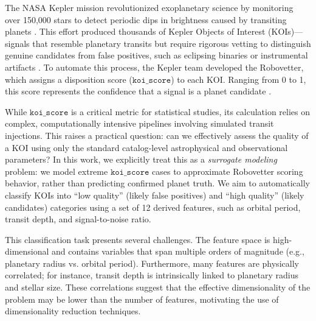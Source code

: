 The NASA Kepler mission revolutionized exoplanetary science by monitoring over 150,000 stars to detect periodic dips in brightness caused by transiting planets \cite{borucki2010kepler}. This effort produced thousands of Kepler Objects of Interest (KOIs)—signals that resemble planetary transits but require rigorous vetting to distinguish genuine candidates from false positives, such as eclipsing binaries or instrumental artifacts \cite{batalha2014kepler, coughlin2016dr24}. To automate this process, the Kepler team developed the Robovetter, which assigns a disposition score ($\texttt{koi\_score}$) to each KOI. Ranging from 0 to 1, this score represents the confidence that a signal is a planet candidate \cite{thompson2018dr25, nasa_koi_docs, nasa_koi_score_doc}.

While $\texttt{koi\_score}$ is a critical metric for statistical studies, its calculation relies on complex, computationally intensive pipelines involving simulated transit injections. This raises a practical question: can we effectively assess the quality of a KOI using only the standard catalog-level astrophysical and observational parameters? In this work, we explicitly treat this as a \textit{surrogate modeling} problem: we model extreme $\texttt{koi\_score}$ cases to approximate Robovetter scoring behavior, rather than predicting confirmed planet truth. We aim to automatically classify KOIs into ``low quality'' (likely false positives) and ``high quality'' (likely candidates) categories using a set of 12 derived features, such as orbital period, transit depth, and signal-to-noise ratio.

This classification task presents several challenges. The feature space is high-dimensional and contains variables that span multiple orders of magnitude (e.g., planetary radius vs. orbital period). Furthermore, many features are physically correlated; for instance, transit depth is intrinsically linked to planetary radius and stellar size. These correlations suggest that the effective dimensionality of the problem may be lower than the number of features, motivating the use of dimensionality reduction techniques.


